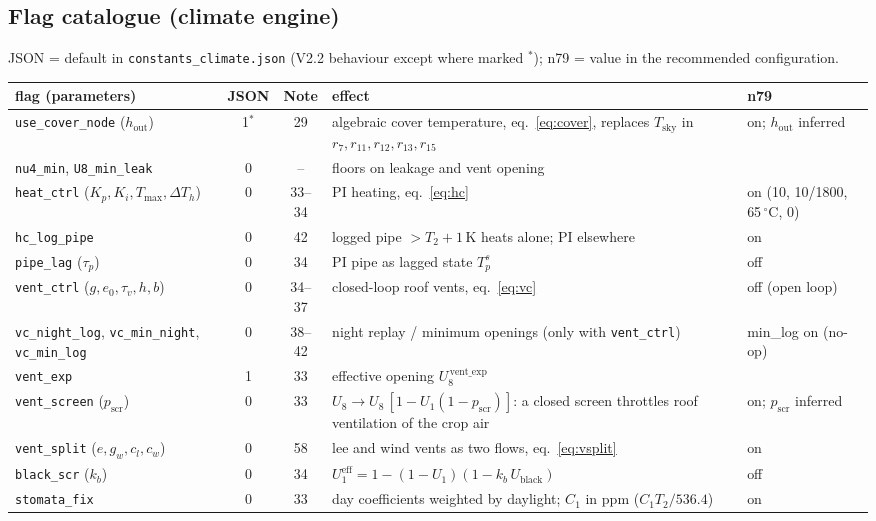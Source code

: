 \documentclass[11pt,a4paper]{article}
\begin{document}
\subsection{Flag catalogue (climate engine)}\label{sec:flagtable}
JSON = default in \texttt{constants\_climate.json} (V2.2 behaviour except where marked $^\ast$);
n79 = value in the recommended configuration.
{\small
\begin{longtable}{>{\raggedright\arraybackslash}p{}c c>{\raggedright\arraybackslash}p{}>{\raggedright\arraybackslash}p{}}
\toprule
flag (parameters) & JSON & Note & effect & n79\\
\midrule\endhead
\texttt{use\_cover\_node} ($h_{\text{out}}$) & 1$^\ast$ & 29 & algebraic cover temperature, eq.~\eqref{eq:cover}, replaces $T_{\text{sky}}$ in $r_7,r_{11},r_{12},r_{13},r_{15}$ & on; $h_{\text{out}}$ inferred\\
\texttt{nu4\_min}, \texttt{U8\_min\_leak} & 0 & -- & floors on leakage and vent opening & 0\\
\texttt{heat\_ctrl} ($K_p,K_i,T_{\max},\Delta T_h$) & 0 & 33--34 & PI heating, eq.~\eqref{eq:hc} & on (10, 10/1800, 65\,$^\circ$C, 0)\\
\texttt{hc\_log\_pipe} & 0 & 42 & logged pipe $>T_2+1$\,K heats alone; PI elsewhere & on\\
\texttt{pipe\_lag} ($\tau_p$) & 0 & 34 & PI pipe as lagged state $T_p^s$ & off\\
\texttt{vent\_ctrl} ($g,e_0,\tau_v,h,b$) & 0 & 34--37 & closed-loop roof vents, eq.~\eqref{eq:vc} & off (open loop)\\
\texttt{vc\_night\_log}, \texttt{vc\_min\_night}, \texttt{vc\_min\_log} & 0 & 38--42 & night replay / minimum openings (only with \texttt{vent\_ctrl}) & min\_log on (no-op)\\
\texttt{vent\_exp} & 1 & 33 & effective opening $U_8^{\,\text{vent\_exp}}$ & 1\\
\texttt{vent\_screen} ($p_{\text{scr}}$) & 0 & 33 & $U_8\to U_8\,[1-U_1(1-p_{\text{scr}})]$: a closed screen throttles roof ventilation of the crop air & on; $p_{\text{scr}}$ inferred\\
\texttt{vent\_split} ($e,g_w,c_l,c_w$) & 0 & 58 & lee and wind vents as two flows, eq.~\eqref{eq:vsplit} & on\\
\texttt{black\_scr} ($k_b$) & 0 & 34 & $U_1^{\text{eff}}=1-(1-U_1)(1-k_b\,U_{\text{black}})$ & off\\
\texttt{stomata\_fix} & 0 & 33 & day coefficients weighted by daylight; $C_1$ in ppm ($C_1T_2/536.4$) & on\\

\end{longtable}}
\end{document}
